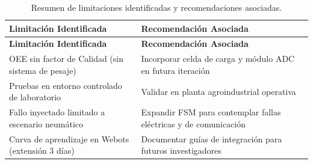 \begin{longtable}{|p{}|p{}|}
\caption{Resumen de limitaciones identificadas y recomendaciones asociadas.}
\label{tab:limitaciones_recomendaciones} \\
\hline
\textbf{Limitación Identificada} & \textbf{Recomendación Asociada} \\
\hline
\endfirsthead

\hline
\textbf{Limitación Identificada} & \textbf{Recomendación Asociada} \\
\hline
\endhead

\hline
\endfoot

\hline
\endlastfoot

OEE sin factor de Calidad (sin sistema de pesaje) & Incorporar celda de carga y módulo ADC en futura iteración \\
\hline
Pruebas en entorno controlado de laboratorio & Validar en planta agroindustrial operativa \\
\hline
Fallo inyectado limitado a escenario neumático & Expandir FSM para contemplar fallas eléctricas y de comunicación \\
\hline
Curva de aprendizaje en Webots (extensión 3 días) & Documentar guías de integración para futuros investigadores \\
\hline
\end{longtable}
